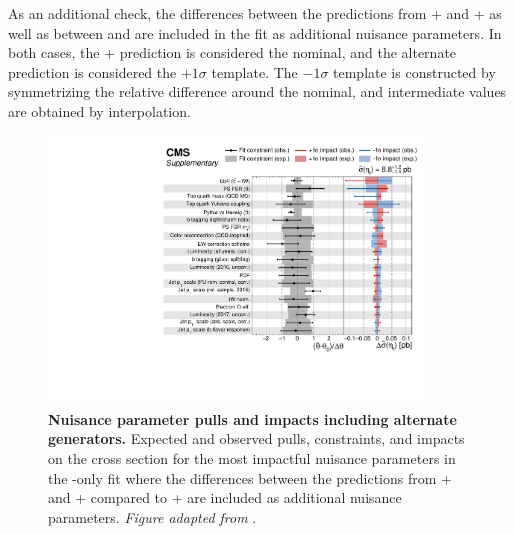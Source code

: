 As an additional check, the differences between the predictions from \powheg \hvq + \herwig and \powheg \hvq + \pythia as well as between \bbfourl and \tttWsum are included in the fit as additional nuisance parameters. In both cases, the \powheg \hvq + \pythia prediction is considered the nominal, and the alternate prediction is considered the $+1\sigma$ template. The $-1\sigma$ template is constructed by symmetrizing the relative difference around the nominal, and intermediate values are obtained by interpolation.

\begin{figure}[!th]
    \centering
    \includegraphics[width=0.9\textwidth]{figures/ah/etatfit/impacts_gennps.pdf}
    \caption{
        \textbf{Nuisance parameter pulls and impacts including alternate generators.} Expected and observed pulls, constraints, and impacts on the \etat cross section for the most impactful nuisance parameters in the \etat-only fit where the differences between the predictions from \powheg \hvq + \herwig and \bbfourl + \pythia compared to \powheg \hvq + \pythia are included as additional nuisance parameters. \textit{Figure adapted from }.
    }
    \label{fig:ah:impacts_etat_gennps}
\end{figure}

